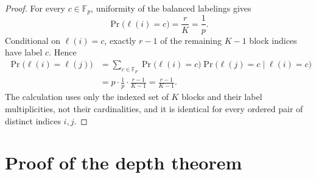 \documentclass[11pt]{article}
\theoremstyle{remark}
\newcommand{\F}{\mathbb F}
\begin{document}
\begin{proof}
For every $c\in\F_p$, uniformity of the balanced labelings gives
\[
  \Pr\bigl(\ell(i)=c\bigr)=\frac{r}{K}=\frac1p.
\]
Conditional on $\ell(i)=c$, exactly $r-1$ of the remaining $K-1$
block indices have label $c$.  Hence
\[
\begin{aligned}
  \Pr\bigl(\ell(i)=\ell(j)\bigr)
  &=\sum_{c\in\F_p}
    \Pr\bigl(\ell(i)=c\bigr)
    \Pr\bigl(\ell(j)=c\mid\ell(i)=c\bigr)\\
  &=p\cdot\frac1p\cdot\frac{r-1}{K-1}
   =\frac{r-1}{K-1}.
\end{aligned}
\]
The calculation uses only the indexed set of $K$ blocks and their label
multiplicities, not their cardinalities, and it is identical for every
ordered pair of distinct indices $i,j$.
\end{proof}

\section{Proof of the depth theorem}
\end{document}
